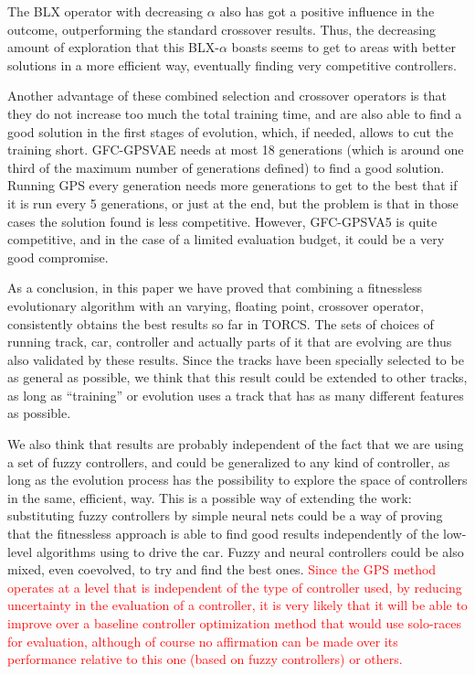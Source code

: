 \documentclass[10pt,journal,compsoc]{IEEEtran}
\begin{document}
The  BLX operator with decreasing $\alpha$ also has got a positive
influence in the outcome, outperforming the standard crossover
results. Thus, the decreasing amount of exploration that this BLX-$\alpha$ boasts seems to get to areas with better solutions in a
more efficient way, eventually finding very competitive controllers.

Another advantage of these combined selection and crossover operators is that they do not
increase too much the total training time, and are also able to find a
good solution in the first stages of evolution, which, if needed,
allows to cut the training short. {\sf GFC-GPSVAE} needs at most 18
generations (which is around one third of the maximum number of
generations defined) to find a good solution. Running GPS every
generation needs more generations to get to the best that if it is run
every 5 generations, or just at the end, but the problem is that in
those cases the solution found is less competitive. However, {\sf
  GFC-GPSVA5} is quite competitive, and in the case of a limited
evaluation budget, it could be a very good compromise.

As a conclusion, in this paper we have proved that combining a
fitnessless evolutionary algorithm with an varying, floating point,
crossover operator, consistently obtains the best results so far in
TORCS. The sets of choices of running track, car, controller and
actually parts of it that are evolving are thus also validated by
these results. Since the tracks have been specially selected to be as
general as possible, we think that this result could be extended to
other tracks, as long as ``training'' or evolution uses a track that
has as many different features as possible.

We also think that results are probably independent of the fact that
we are using a set of fuzzy controllers, and could be
generalized to any kind of controller, as long as the evolution
process has the possibility to explore the space of controllers in the
same, efficient, way. This is a possible way of extending the work:
substituting fuzzy controllers by simple neural nets could be a way of
proving that the fitnessless approach is able to find good results
independently of the low-level algorithms using to drive the
car. Fuzzy and neural controllers could be also mixed, even coevolved,
to try and find the best ones. \textcolor{red}{Since the GPS method
  operates at a level that is independent of the type of controller used, by
  reducing uncertainty in the evaluation of a controller, it is very
  likely that it will be able to improve over a baseline controller
  optimization method that would use solo-races for evaluation, although of course no affirmation
  can be made over its performance relative to this one (based on
  fuzzy controllers) or others.}
\end{document}
